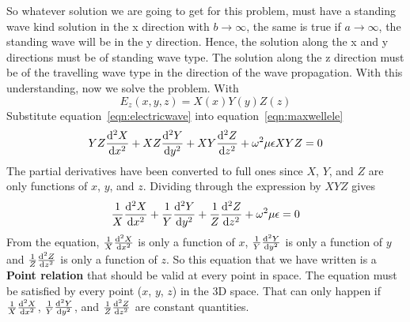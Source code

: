 So whatever solution we are going to get for this problem, must have a standing wave kind solution in the x direction with $b\rightarrow \infty$, the same is true if $a\rightarrow \infty$, the standing wave will be in the y direction. Hence, the solution along the x and y directions must be of standing wave type. The solution along the z direction must be of the travelling wave type in the direction of the wave propagation. With this understanding, now we solve the problem. With
\begin{equation}
E_z (x,y,z) = X(x)Y(y)Z(z)
\label{eqn:electricwave}
\end{equation}
Substitute equation~\ref{eqn:electricwave} into equation~\ref{eqn:maxwellele}
\begin{align}
YZ \dv[2]{X}{x} + XZ \dv[2]{Y}{y} + XY \dv[2]{Z}{z}+ \omega^2\mu\epsilon {XYZ} = 0
\end{align}
The partial derivatives have been converted to full ones since $X$, $Y$, and $Z$ are only functions of $x$, $y$, and $z$. Dividing through the expression by $XYZ$ gives
\begin{align}
\frac{1}{X}\dv[2] {X}{x} + \frac{1}{Y}\dv[2]{Y}{y} + \frac{1}{Z} \dv[2]{Z}{z} + \omega^2\mu\epsilon = 0
\label{eqn:diffeqn}
\end{align}
From the equation, $\frac{1}{X}\dv[2] {X}{x}$ is only a function of $x$, $\frac{1}{Y}\dv[2]{Y}{y}$ is only a function of $y$ and $\frac{1}{Z} \dv[2]{Z}{z}$ is only a function of $z$. So this equation that we have written is a \textbf{Point relation} that should be valid at every point in space. The equation must be satisfied by every point ($x$, $y$, $z$) in the 3D space. That can only happen if $\frac{1}{X}\dv[2] {X}{x}$, $\frac{1}{Y}\dv[2]{Y}{y}$, and $\frac{1}{Z} \dv[2]{Z}{z}$ are constant quantities.

